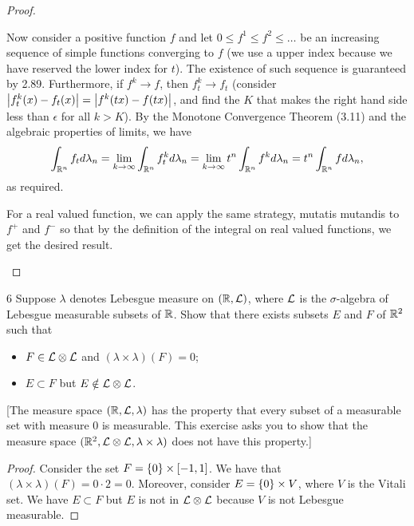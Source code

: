 \begin{proof}
\begin{enumerate}
    Now consider a positive function $f$ and let $0 \leq f^1 \leq f^2 \leq \dots$ be an increasing sequence of simple functions converging to $f$ (we use a upper index because we have reserved the lower index for $t$).
    The existence of such sequence is guaranteed by 2.89.
    Furthermore, if $f^k \to f$, then $f_t^k \to f_t$ (consider $\left\lvert f_t^k(x) - f_t(x)\right\rvert = \left\lvert f^k(tx) - f(tx)\right\rvert$, and find the $K$ that makes the right hand side less than $\epsilon$ for all $k > K$).
    By the Monotone Convergence Theorem (3.11) and the algebraic properties of limits, we have
    \begin{align*}
        \int_{\mathbb{R}^n} f_t d\lambda_n
        = \lim_{k \to \infty} \int_{\mathbb{R}^n} f_t^k d\lambda_n
        = \lim_{k \to \infty} t^n \int_{\mathbb{R}^n} f^k d\lambda_n
        = t^n \int_{\mathbb{R}^n} f d\lambda_n,
    \end{align*}
    as required.

    For a real valued function, we can apply the same strategy, mutatis mutandis to $f^+$ and $f^-$ so that by the definition of the integral on real valued functions, we get the desired result.
\end{enumerate}
\end{proof} 

\begin{exercise}{6}
Suppose $\lambda$ denotes Lebesgue measure on $(\mathbb{R}, \mathcal{L})$, where $\mathcal{L}$ is the $\sigma$-algebra of Lebesgue measurable subsets of $\mathbb{R}$.
Show that there exists subsets $E$ and $F$ of $\mathbb{R}^2$ such that 
\begin{itemize}
    \item $F \in \mathcal{L} \otimes \mathcal{L}$ and $(\lambda \times \lambda)(F) = 0$;
    \item $E \subset F$ but $E \notin \mathcal{L} \otimes \mathcal{L}$.
\end{itemize}
[The measure space $(\mathbb{R}, \mathcal{L}, \lambda)$ has the property that every subset of a measurable set with measure 0 is measurable.
This exercise asks you to show that the measure space $(\mathbb{R}^2, \mathcal{L} \otimes \mathcal{L}, \lambda \times \lambda)$ does not have this property.]
\end{exercise}
\begin{proof}
Consider the set $F = \{0\} \times [-1,1]$.
We have that $(\lambda \times \lambda)(F) = 0 \cdot 2 = 0$.
Moreover, consider $E = \{0\} \times V$, where $V$ is the Vitali set.
We have $E \subset F$ but $E$ is not in $\mathcal{L} \otimes \mathcal{L}$ because $V$ is not Lebesgue measurable.
\end{proof} 

